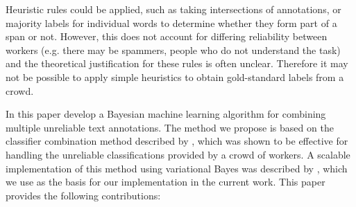 Heuristic rules could be applied, such as taking intersections of annotations, or majority labels for individual words to determine whether they form part of a span or not. However, this does not account for differing reliability between workers (e.g. there may be spammers, people who do not understand the task) and the theoretical justification for these rules is often unclear. Therefore it may not be possible to apply simple heuristics to obtain gold-standard labels from a crowd. 

In this paper develop a Bayesian machine learning algorithm for combining multiple unreliable text annotations.
The method we propose is based on the classifier combination method described by \cite{kim2012bayesian}, 
which was shown to be effective for handling the unreliable classifications provided by a crowd of workers. A scalable implementation of this method using variational Bayes was described by \cite{simpsonlong}, which we use as the basis for our implementation in the current work. This paper provides the following contributions:
